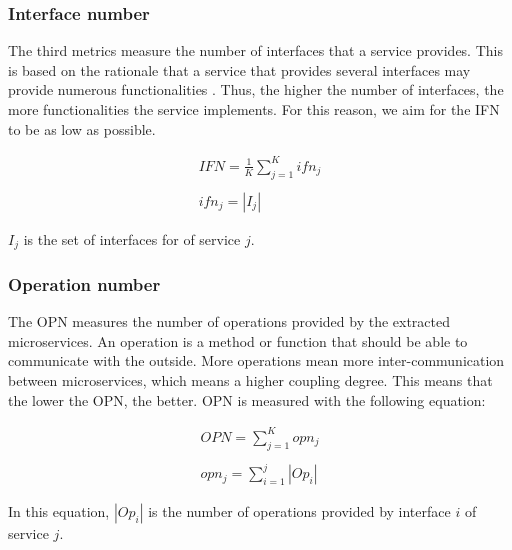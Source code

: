 \subsubsection{Interface number}\label{sss:step4_ifn}
The third metrics measure the number of interfaces that a service provides. This is based on the rationale that a service that provides several interfaces may provide numerous functionalities \cite{adjoyan2014service}. Thus, the higher the number of interfaces, the more functionalities the service implements. For this reason, we aim for the IFN to be as low as possible.

\begin{equation}
    \begin{split}
        IFN = \frac{1}{K} \sum_{j=1}^{K} ifn_j \\\\
        ifn_j = |I_j|
    \end{split}
\end{equation}

$I_j$ is the set of interfaces for of service $j$. 

\subsubsection{Operation number}\label{sss:step4_opn}
The OPN measures the number of operations provided by the extracted microservices. An operation is a method or function that should be able to communicate with the outside. More operations mean more inter-communication between microservices, which means a higher coupling degree. This means that the lower the OPN, the better. OPN is measured with the following equation:

\begin{equation}
    \begin{split}
        OPN = \sum_{j=1}^{K} opn_j \\\\
        opn_j = \sum_{i=1}^{j} |Op_i|
    \end{split}
\end{equation}

In this equation, $|Op_i|$ is the number of operations provided by interface $i$ of service $j$.

